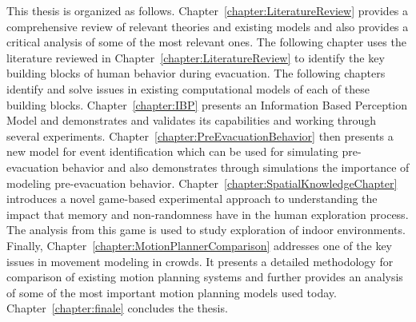  This thesis is organized as follows. Chapter~\ref{chapter:LiteratureReview} provides a comprehensive review of relevant theories and existing models and also provides a critical analysis of some of the most relevant ones. The following chapter uses the literature reviewed in Chapter~\ref{chapter:LiteratureReview} to identify the key building blocks of human behavior during evacuation. The following chapters identify and solve issues in existing computational models of each of these building blocks.
Chapter~\ref{chapter:IBP} presents an Information Based Perception Model and demonstrates and validates its capabilities and working through several experiments. Chapter~\ref{chapter:PreEvacuationBehavior} then presents a new model for event identification which can be used for simulating pre-evacuation behavior and also demonstrates through simulations the importance of modeling pre-evacuation behavior. Chapter~\ref{chapter:SpatialKnowledgeChapter} introduces a novel game-based experimental approach to understanding the impact that memory and non-randomness have in the human exploration process. The analysis from this game is used to study exploration of indoor environments. Finally, Chapter~\ref{chapter:MotionPlannerComparison} addresses one of the key issues in movement modeling in crowds. It presents a detailed methodology for comparison of existing motion planning systems and further provides an analysis of some of the most important motion planning models used today. Chapter~\ref{chapter:finale} concludes the thesis.


